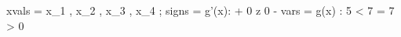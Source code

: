 

xvals =        x_1 , x_2 , x_3 , x_4 ;
signs = g'(x):     +  0  z  0  -
vars  = g(x) :  5  <  7  =  7  >  0
